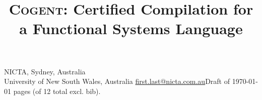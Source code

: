 \documentclass[9pt\ifFinal\else,preprint,nocopyrightspace\fi,\ifAlpha\else natbib,authoryear\fi]{sigplanconf}
\newcommand{\TODO}[1]{\textbf{\textsl{TODO: #1}}}
\newcommand{\TODO}[1]{\relax}
\begin{document}
\newtheorem{lemma}{Lemma}
\newtheorem{definition}{Definition}
\newtheorem{assumption}{Assumption}
\newtheorem{theorem}{Theorem}





\newcommand{\CDSL}{\textsc{Cogent}\xspace}
\newcommand{\cdsl}{\CDSL}
\newcommand{\DDSL}{DDSL\xspace}
\newcommand{\todo}[1]{\TODO{#1}}

\newcommand{\Cone}{\ding{172}\xspace}
\newcommand{\Ctwo}{\ding{173}\xspace}
\newcommand{\Cthree}{\ding{174}\xspace}
\newcommand{\Cfour}{\ding{175}\xspace}

\normalem

  \def\Snospace~{\S\nobreak\hspace{0.1ex}{}}
\renewcommand{\figureautorefname}{Fig.}
  \renewcommand{\sectionautorefname}{\Snospace}
  \renewcommand{\subsectionautorefname}{\Snospace}
  \renewcommand{\subsubsectionautorefname}{\Snospace}
  \renewcommand{\appendixautorefname}{Appendix}
  \renewcommand{\Hfootnoteautorefname}{Footnote}
\newcommand{\Htextbf}[1]{\textbf{\hyperpage{#1}}}

  \makeatletter
  \newsavebox{\@brx}
  \newcommand{\llangle}[1][]{\savebox{\@brx}{}\mathopen{\copy\@brx\mkern2mu\kern-0.9\wd\@brx\usebox{\@brx}}}
  \newcommand{\rrangle}[1][]{\savebox{\@brx}{}\mathclose{\copy\@brx\mkern2mu\kern-0.9\wd\@brx\usebox{\@brx}}}
  \makeatother

\title{\CDSL: Certified Compilation for a Functional Systems Language}




  {NICTA, Sydney, Australia \\
            University of New South Wales, Australia}
  {\href{mailto:christine.rizkallah@nicta.com.au}{first.last@nicta.com.au}\ifDraft Draft of \today \pageref{p:lastpage} pages (of 12 total excl. bib). \fi}


  \maketitle
\end{document}
